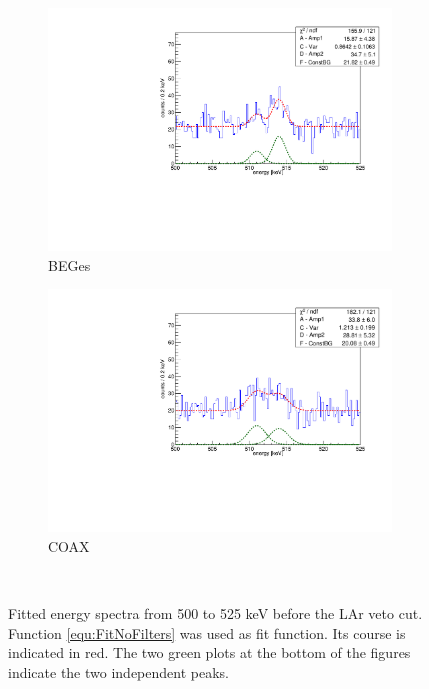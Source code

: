 \documentclass[encoding=utf8,british]{tumphthesis}
\begin{document}
\begin{figure}[t!]
	\centering
	\begin{subfigure}{.5\textwidth}
		\centering
		\includegraphics[width=\textwidth]{./Bilder/500525FitNoFilterBEGes.pdf}
		\caption{BEGes}
		\label{fig:FitNoFilterBEGes}
	\end{subfigure}\hfill%
	\begin{subfigure}{.5\textwidth}
		\centering
		\includegraphics[width=\textwidth]{./Bilder/500525FitNoFilterCOAX.pdf}
		\caption{COAX}
		\label{fig:FitNoFilterCOAX}
	\end{subfigure}
    \\
	\caption{
		Fitted energy spectra from 500 to 525 keV before the LAr veto cut. 
		Function \ref{equ:FitNoFilters} was used as fit function. 
		Its course is indicated in red. 
		The two green plots at the bottom of the figures indicate the two independent peaks. 
		}
\end{figure}
\\
\end{document}
